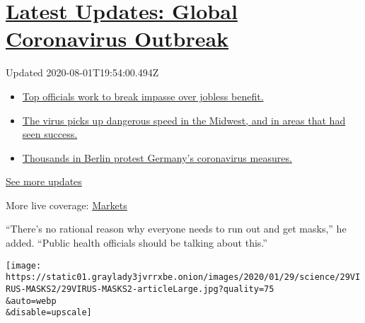 \hypertarget{latest-updates-global-coronavirus-outbreak}{%
\section{\texorpdfstring{\href{https://www.nytimes3xbfgragh.onion/2020/08/01/world/coronavirus-covid-19.html?action=click\&pgtype=Article\&state=default\&region=MAIN_CONTENT_1\&context=storylines_live_updates}{Latest
Updates: Global Coronavirus
Outbreak}}{Latest Updates: Global Coronavirus Outbreak}}\label{latest-updates-global-coronavirus-outbreak}}

Updated 2020-08-01T19:54:00.494Z

\begin{itemize}
\tightlist
\item
  \href{https://www.nytimes3xbfgragh.onion/2020/08/01/world/coronavirus-covid-19.html?action=click\&pgtype=Article\&state=default\&region=MAIN_CONTENT_1\&context=storylines_live_updates\#link-3ac56579}{Top
  officials work to break impasse over jobless benefit.}
\item
  \href{https://www.nytimes3xbfgragh.onion/2020/08/01/world/coronavirus-covid-19.html?action=click\&pgtype=Article\&state=default\&region=MAIN_CONTENT_1\&context=storylines_live_updates\#link-8796723}{The
  virus picks up dangerous speed in the Midwest, and in areas that had
  seen success.}
\item
  \href{https://www.nytimes3xbfgragh.onion/2020/08/01/world/coronavirus-covid-19.html?action=click\&pgtype=Article\&state=default\&region=MAIN_CONTENT_1\&context=storylines_live_updates\#link-25930521}{Thousands
  in Berlin protest Germany's coronavirus measures.}
\end{itemize}

\href{https://www.nytimes3xbfgragh.onion/2020/08/01/world/coronavirus-covid-19.html?action=click\&pgtype=Article\&state=default\&region=MAIN_CONTENT_1\&context=storylines_live_updates}{See
more updates}

More live coverage:
\href{https://www.nytimes3xbfgragh.onion/live/2020/07/31/business/stock-market-today-coronavirus?action=click\&pgtype=Article\&state=default\&region=MAIN_CONTENT_1\&context=storylines_live_updates}{Markets}

``There's no rational reason why everyone needs to run out and get
masks,'' he added. ``Public health officials should be talking about
this.''

\texttt{[image: https://static01.graylady3jvrrxbe.onion/images/2020/01/29/science/29VIRUS-MASKS2/29VIRUS-MASKS2-articleLarge.jpg?quality=75\\\&auto=webp\\\&disable=upscale]}

